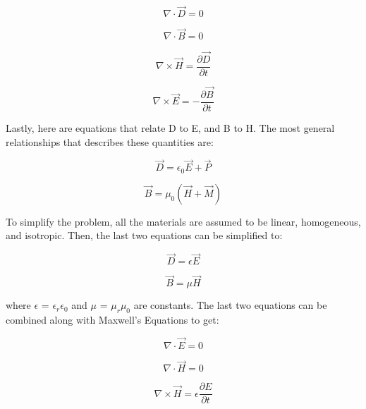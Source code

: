 \documentclass[12pt]{article}
\begin{document}
\begin{equation}
	\nabla \cdot \vec{D} = 0
\end{equation}

\begin{equation}
	\nabla \cdot \vec{B} = 0
\end{equation}

\begin{equation}
	\nabla \times \vec{H} = \frac{\partial \vec{D}}{\partial t}
\end{equation}

\begin{equation}
	\nabla \times \vec{E} = -\frac{\partial \vec{B}}{\partial t}
\end{equation}

Lastly, here are equations that relate D to E, and B to H. The most general relationships that describes these quantities are:

\begin{equation}
	\vec{D} = \epsilon_{0}\vec{E} + \vec{P}
\end{equation}

\begin{equation}
	\vec{B} = \mu_{0}(\vec{H} + \vec{M})
\end{equation}

To simplify the problem, all the materials are assumed to be linear, homogeneous, and isotropic. Then, the last two equations can be simplified to:

\begin{equation}
	\vec{D} = \epsilon\vec{E}
\end{equation}

\begin{equation}
	\vec{B} = \mu\vec{H}
\end{equation}

where \(\epsilon\) = \(\epsilon_{r}\)\(\epsilon_{0}\) and \(\mu\) = \(\mu_{r}\)\(\mu_{0}\) are constants. The last two equations can be combined along with Maxwell's Equations to get:

\begin{equation}
	\nabla \cdot \vec{E} = 0
\end{equation}

\begin{equation}
	\nabla \cdot \vec{H} = 0
\end{equation}

\begin{equation}
	\nabla \times \vec{H} = \epsilon\frac{\partial E}{\partial t}
\end{equation}
\end{document}
